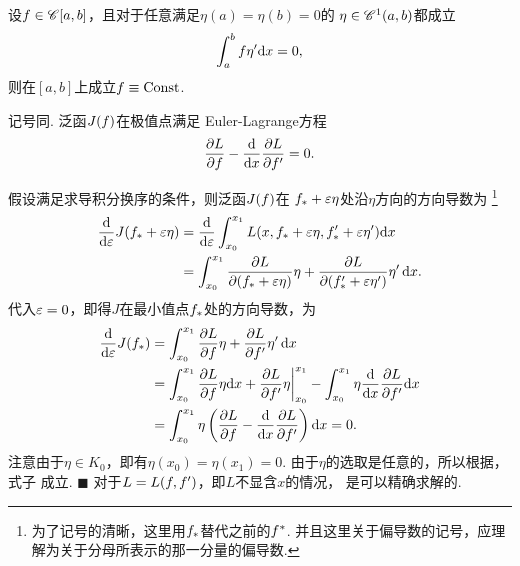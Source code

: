   \begin{lemma}[变分引理 II]
    设$\mathnormal{f}\in\mathscr{C}[a, b]$，且对于任意满足$\eta(a) = \eta(b) = 0$的
    $\eta\in\mathscr{C}^1(a, b)$都成立
    \[
      \int_a^b\mathnormal{f}\eta^\prime\mathrm{d} x = 0,
    \]
    则在$[a, b]$上成立$\mathnormal{f}\equiv \text{Const}$.
  \end{lemma}

  \begin{thm}
    \label{thm: Euler-Lagrange方程}
    记号同. 泛函$J(\mathnormal{f})$在极值点满足
    Euler-Lagrange方程
    \begin{equation}
      \label{equ: Euler-Lagrange方程}
      \frac{\partial L}{\partial\mathnormal{f}} - \frac{\mathrm{d}}{\mathrm{d} x}\frac{\partial L}{\partial\mathnormal{f}^\prime} = 0.
    \end{equation}
  \end{thm}
  \proof
    假设满足求导积分换序的条件，则泛函$J(\mathnormal{f})$在
    $\mathnormal{f}_*+\varepsilon\eta$处沿$\eta$方向的方向导数为
    \footnote{为了记号的清晰，这里用$\mathnormal{f}_*$替代之前的$\mathnormal{f}^*$.
    并且这里关于偏导数的记号，应理解为关于分母所表示的那一分量的偏导数. }
    \[\begin{split}
      \frac{\mathrm{d}}{\mathrm{d}\varepsilon}J(\mathnormal{f}_*+\varepsilon\eta) &=
      \frac{\mathrm{d}}{\mathrm{d}\varepsilon}\int_{x_0}^{x_1}L(x,\mathnormal{f}_*+\varepsilon\eta,\mathnormal{f}_*^\prime+\varepsilon\eta^\prime)\mathrm{d} x\\
      &= \int_{x_0}^{x_1} \frac{\partial L}{\partial (\mathnormal{f}_*+\varepsilon\eta)}\eta
      +\frac{\partial L}{\partial (\mathnormal{f}_*^\prime+\varepsilon\eta^\prime)}\eta^\prime\,\mathrm{d} x.
    \end{split}\]
    代入$\varepsilon=0$，即得$J$在最小值点$\mathnormal{f}_*$处的方向导数，为
    \[\begin{split}
      \frac{\mathrm{d}}{\mathrm{d}\varepsilon}J(\mathnormal{f}_*) &=
      \int_{x_0}^{x_1} \frac{\partial L}{\partial \mathnormal{f}}\eta
      +\frac{\partial L}{\partial \mathnormal{f}^\prime}\eta^\prime\,\mathrm{d} x \\
      &= \int_{x_0}^{x_1} \frac{\partial L}{\partial\mathnormal{f}}\eta\mathrm{d} x
      + \frac{\partial L}{\partial\mathnormal{f}^\prime}\eta\bigg|_{x_0}^{x_1}
      - \int_{x_0}^{x_1}\eta\frac{\mathrm{d}}{\mathrm{d} x}\frac{\partial L}{\partial \mathnormal{f}^\prime}\mathrm{d} x\\
      &= \int_{x_0}^{x_1} \eta\left( \frac{\partial L}{\partial\mathnormal{f}}
      - \frac{\mathrm{d}}{\mathrm{d} x}\frac{\partial L}{\partial\mathnormal{f}^\prime} \right) \mathrm{d} x = 0.
    \end{split}\]
    注意由于$\eta\in K_0$，即有$\eta(x_0) = \eta(x_1) = 0$.
    由于$\eta$的选取是任意的，所以根据，式子
    成立. $\blacksquare$
  \remark
    对于$L = L(\mathnormal{f},\mathnormal{f}^\prime)$，即$L$不显含$x$的情况，
    是可以精确求解的.

